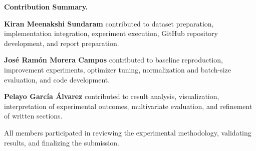 \documentclass[conference]{IEEEtran}
\begin{document}
\textbf{Contribution Summary.}

\textbf{Kiran Meenakshi Sundaram} contributed to dataset preparation, implementation integration, experiment execution, GitHub repository development, and report preparation.

\textbf{Jos\'e Ram\'on Morera Campos} contributed to baseline reproduction, improvement experiments, optimizer tuning, normalization and batch-size evaluation, and code development.

\textbf{Pelayo Garc\'ia \'Alvarez} contributed to result analysis, visualization, interpretation of experimental outcomes, multivariate evaluation, and refinement of written sections.

All members participated in reviewing the experimental methodology, validating results, and finalizing the submission.
\end{document}
